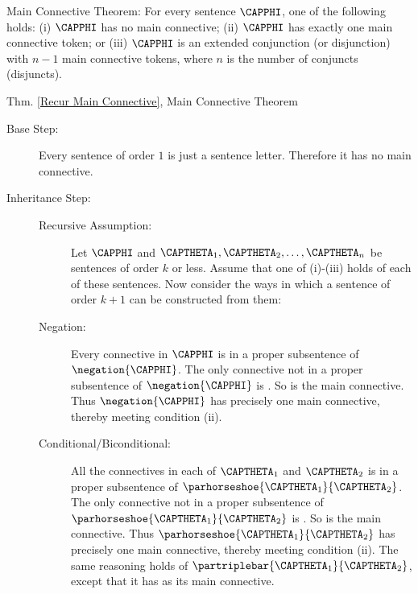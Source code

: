 \begin{THEOREM}{ Main Connective Theorem:} 
For every \GSL{} sentence $\CAPPHI$, one of the following holds: (i) $\CAPPHI$ has no main connective; (ii) $\CAPPHI$ has exactly one main connective token; or (iii) $\CAPPHI$ is an extended conjunction (or disjunction) with $n-1$ main connective tokens, where $n$ is the number of conjuncts (disjuncts).
\end{THEOREM}
\begin{PROOFOF}{Thm. \ref{Recur Main Connective}, Main Connective Theorem}
\begin{description}
\item[Base Step:] 
Every \GSL{} sentence of order $1$ is just a sentence letter. Therefore it has no main connective.
 
\item[Inheritance Step:] \hfill{}

\begin{description}

\item[Recursive Assumption:] Let $\CAPPHI$ and $\CAPTHETA_1,\CAPTHETA_2,\ldots,\CAPTHETA_{\integer{n}}$ be sentences of order $k$ or less. Assume that one of (i)-(iii) holds of each of these sentences. Now consider the ways in which a sentence of order $k+1$ can be constructed from them:

\item[Negation:] Every connective in $\CAPPHI$ is in a proper subsentence of $\negation{\CAPPHI}$.
The only connective not in a proper subsentence of $\negation{\CAPPHI}$ is \mention{$\NEGATION$}.
So \mention{$\NEGATION$} is the main connective.
Thus $\negation{\CAPPHI}$ has precisely one main connective, thereby meeting condition (ii).

\item[Conditional/Biconditional:] All the connectives in each of $\CAPTHETA_1$ and $\CAPTHETA_2$ is in a proper subsentence of $\parhorseshoe{\CAPTHETA_1}{\CAPTHETA_2}$.
The only connective not in a proper subsentence of $\parhorseshoe{\CAPTHETA_1}{\CAPTHETA_2}$ is \mention{$\HORSESHOE$}.
So \mention{$\HORSESHOE$} is the main connective.
Thus $\parhorseshoe{\CAPTHETA_1}{\CAPTHETA_2}$ has precisely one main connective, thereby meeting condition (ii).
The same reasoning holds of $\partriplebar{\CAPTHETA_1}{\CAPTHETA_2}$, except that it has \mention{$\TRIPLEBAR$} as its main connective.


\end{description}
\end{description}
\end{PROOFOF}
